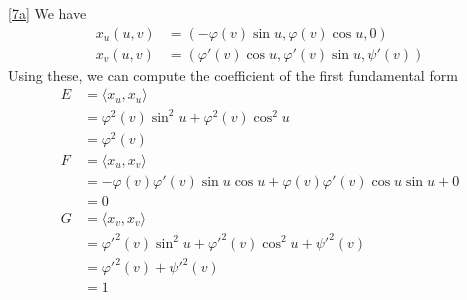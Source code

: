 \documentclass[a4paper]{report}
\begin{document}
\ref{7a} We have
\begin{align}
x_u(u,v) &= \left(-\varphi(v)\sin u, \varphi(v) \cos u ,0  \right)\\
x_v(u,v) &=
\left(\varphi'(v) \cos u, \varphi'(v) \sin u , \psi'(v) \right)
\end{align}
Using these, we can compute the coefficient of the first fundamental form
\begin{align}
E &= \langle x_u, x_u \rangle\\
&= \varphi^2(v) \sin^2 u + \varphi^2(v) \cos^2 u\\
&= \varphi^2(v) \\
F &= \langle x_u, x_v \rangle \\
&=  -\varphi(v)\varphi'(v)\sin u \cos u + \varphi(v)\varphi'(v) \cos u \sin u + 0 \\
&= 0\\
G &= \langle x_v, x_v \rangle \\
&= {\varphi'}^2(v) \sin^2 u + {\varphi'}^2(v) \cos^2 u + {\psi'}^2(v)\\
&= {\varphi'}^2(v) + {\psi'}^2(v)\\
&= 1
\end{align}
\end{document}
